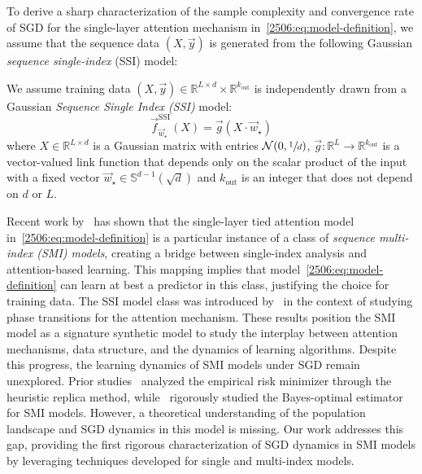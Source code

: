 To derive a sharp characterization of the sample complexity and convergence rate of SGD for the single-layer attention mechanism in~\cref{2506:eq:model-definition}, we assume that the sequence data $(X, \vec{y})$ is generated from the following Gaussian \emph{sequence single-index} (SSI) model:
\begin{assumption} 
\label{2506:def:gsim}
We assume training data $(X, \vec{y})\in\mathbb{R}^{L\times d}\times \mathbb{R}^{k_\mathrm{out}}$ is independently drawn from a Gaussian \emph{Sequence Single Index (SSI)} model:
    \begin{equation}
    \label{2506:eq:gssim}
        \vec{f}^\mathrm{SSI}_{\vec w_{\star}}(X) = \vec{g}{\left(X\cdot \vec{w}_{\star}\right)}
    \end{equation}
    where $X\in\mathbb{R}^{L\times d}$ is a Gaussian matrix with entries $\mathcal{N}(0,\sfrac{1}{d})$, \(\vec{g}\colon \mathbb{R}^L\to\mathbb{R}^{k_\mathrm{out}}\) is a vector-valued link function that depends only on the scalar product of the input with a fixed vector \(\vec{w}_\star\in\mathbb{S}^{d-1}(\sqrt{d})\) and \(k_\mathrm{out}\) is an integer that does not depend on \(d\) or \(L\).  
\end{assumption}  
Recent work by~\citep{cui2024phase,troiani2025fundamental,cui2025high} has shown that the single-layer tied attention model in~\cref{2506:eq:model-definition} is a particular instance of a class of \emph{sequence multi-index (SMI) models}, creating a bridge between single-index analysis and attention-based learning. This mapping implies that model~\cref{2506:eq:model-definition} can learn at best a predictor in this class, justifying the choice for training data. The SSI model class was introduced by~\cite{cui2024phase} in the context of studying phase transitions for the attention mechanism. These results position the SMI model as a signature synthetic model to study the interplay between attention mechanisms, data structure, and the dynamics of learning algorithms. Despite this progress, the learning dynamics of SMI models under SGD remain unexplored. Prior studies~\citep{cui2025high,cui2024phase} analyzed the empirical risk minimizer through the heuristic replica method, while~\citep{troiani2025fundamental} rigorously studied the Bayes-optimal estimator for SMI models. However, a theoretical understanding of the population landscape and SGD dynamics in this model is missing. Our work addresses this gap, providing the first rigorous characterization of SGD dynamics in SMI models by leveraging techniques developed for single and multi-index models. 


